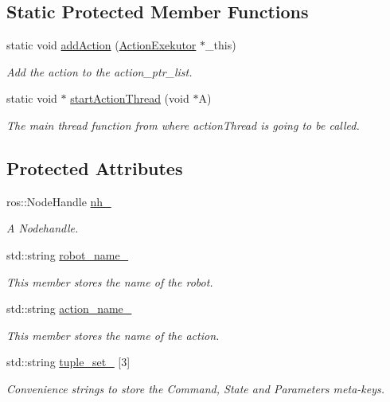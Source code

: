 \subsection*{\-Static \-Protected \-Member \-Functions}
\begin{DoxyCompactItemize}
\item 
static void \hyperlink{classexekutor_1_1ActionExekutor_ad2beec0ac18fbdaccf66fea31dbc9f69}{add\-Action} (\hyperlink{classexekutor_1_1ActionExekutor}{\-Action\-Exekutor} $\ast$\-\_\-this)
\begin{DoxyCompactList}\small\item\em \-Add the action to the action\-\_\-ptr\-\_\-list. \end{DoxyCompactList}\item 
static void $\ast$ \hyperlink{classexekutor_1_1ActionExekutor_a0637295658ad106f0ed3661be8f52c13}{start\-Action\-Thread} (void $\ast$\-A)
\begin{DoxyCompactList}\small\item\em \-The main thread function from where action\-Thread is going to be called. \end{DoxyCompactList}\end{DoxyCompactItemize}
\subsection*{\-Protected \-Attributes}
\begin{DoxyCompactItemize}
\item 
ros\-::\-Node\-Handle \hyperlink{classexekutor_1_1ActionExekutor_a1f0541608c4f27f3c72ab22b1874c882}{nh\-\_\-}
\begin{DoxyCompactList}\small\item\em \-A \-Nodehandle. \end{DoxyCompactList}\item 
std\-::string \hyperlink{classexekutor_1_1ActionExekutor_af165894bbbbabd62c17be857be095936}{robot\-\_\-name\-\_\-}
\begin{DoxyCompactList}\small\item\em \-This member stores the name of the robot. \end{DoxyCompactList}\item 
std\-::string \hyperlink{classexekutor_1_1ActionExekutor_ad0ab1bb7a2575962ee5fc9e2150c5d50}{action\-\_\-name\-\_\-}
\begin{DoxyCompactList}\small\item\em \-This member stores the name of the action. \end{DoxyCompactList}\item 
std\-::string \hyperlink{classexekutor_1_1ActionExekutor_a4407dd299ca8494945da306b6a367108}{tuple\-\_\-set\-\_\-} \mbox{[}3\mbox{]}
\begin{DoxyCompactList}\small\item\em \-Convenience strings to store the \-Command, \-State and \-Parameters meta-\/keys. \end{DoxyCompactList}\end{DoxyCompactItemize}
